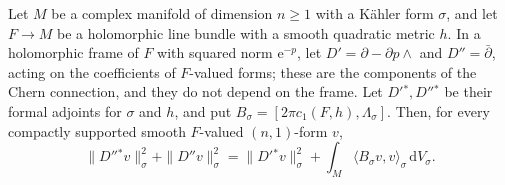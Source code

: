 \begin{lemma}\label{lem:kahler-bochner-kodaira}
Let $M$ be a complex manifold of dimension $n\geq1$ with a K\"ahler form $\sigma$, and let $F\to M$ be a holomorphic line bundle with a smooth quadratic metric $h$. In a holomorphic frame of $F$ with squared norm $\mathrm e^{-p}$, let $D'=\partial-\partial p\wedge$ and $D''=\bar\partial$, acting on the coefficients of $F$-valued forms; these are the components of the Chern connection, and they do not depend on the frame. Let $D'{}^*,D''{}^*$ be their formal adjoints for $\sigma$ and $h$, and put $B_\sigma=[2\pi c_1(F,h),\Lambda_\sigma]$. Then, for every compactly supported smooth $F$-valued $(n,1)$-form $v$,
\begin{equation}\label{eq:kahler-bundle-bochner}
 \|D''{}^*v\|_\sigma^2+\|D''v\|_\sigma^2
 =\|D'{}^*v\|_\sigma^2+
       \int_M\langle B_\sigma v,v\rangle_\sigma\,\mathrm dV_\sigma.
\end{equation}
\end{lemma}
